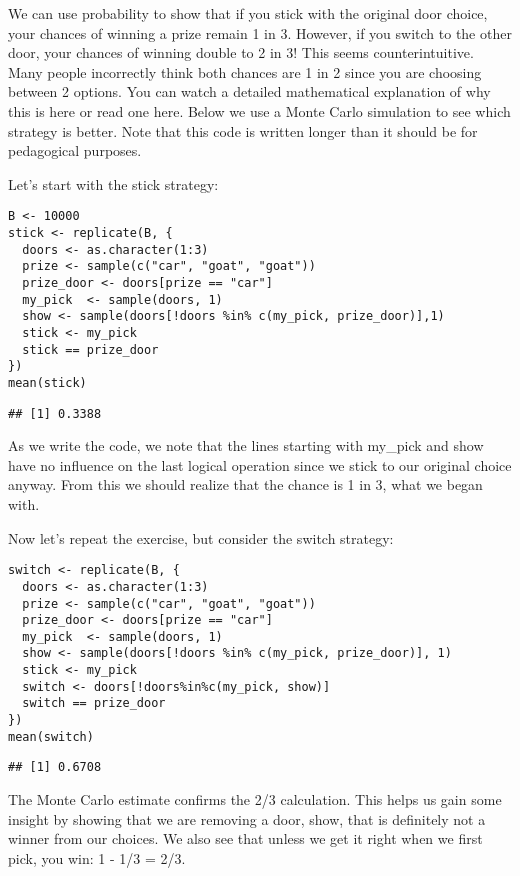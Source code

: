 \documentclass[
]{article}
\begin{document}
We can use probability to show that if you stick with the original door
choice, your chances of winning a prize remain 1 in 3. However, if you
switch to the other door, your chances of winning double to 2 in 3! This
seems counterintuitive. Many people incorrectly think both chances are 1
in 2 since you are choosing between 2 options. You can watch a detailed
mathematical explanation of why this is here or read one here. Below we
use a Monte Carlo simulation to see which strategy is better. Note that
this code is written longer than it should be for pedagogical purposes.

Let's start with the stick strategy:

\begin{verbatim}
B <- 10000
stick <- replicate(B, {
  doors <- as.character(1:3)
  prize <- sample(c("car", "goat", "goat"))
  prize_door <- doors[prize == "car"]
  my_pick  <- sample(doors, 1)
  show <- sample(doors[!doors %in% c(my_pick, prize_door)],1)
  stick <- my_pick
  stick == prize_door
})
mean(stick)
\end{verbatim}

\begin{verbatim}
## [1] 0.3388
\end{verbatim}

As we write the code, we note that the lines starting with my\_pick and
show have no influence on the last logical operation since we stick to
our original choice anyway. From this we should realize that the chance
is 1 in 3, what we began with.

Now let's repeat the exercise, but consider the switch strategy:

\begin{verbatim}
switch <- replicate(B, {
  doors <- as.character(1:3)
  prize <- sample(c("car", "goat", "goat"))
  prize_door <- doors[prize == "car"]
  my_pick  <- sample(doors, 1)
  show <- sample(doors[!doors %in% c(my_pick, prize_door)], 1)
  stick <- my_pick
  switch <- doors[!doors%in%c(my_pick, show)]
  switch == prize_door
})
mean(switch)
\end{verbatim}

\begin{verbatim}
## [1] 0.6708
\end{verbatim}

The Monte Carlo estimate confirms the 2/3 calculation. This helps us
gain some insight by showing that we are removing a door, show, that is
definitely not a winner from our choices. We also see that unless we get
it right when we first pick, you win: 1 - 1/3 = 2/3.
\end{document}
